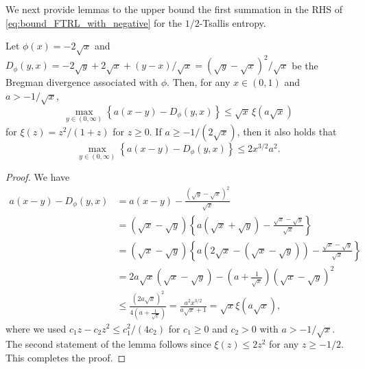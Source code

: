 We next provide lemmas to the upper bound the first summation in the RHS of \eqref{eq:bound_FTRL_with_negative} for the $1/2$-Tsallis entropy.
\begin{lemma}\label{lem:tsalis_stab_onedim}
Let $\phi(x) = - 2 \sqrt{x}$
and
$D_\phi(y, x) = - 2 \sqrt{y} + 2 \sqrt{x} + (y-x)/\sqrt{x} = (\sqrt{y} - \sqrt{x})^2 / \sqrt{x}$ 
be the Bregman divergence associated with $\phi$.
Then, for any 
$x \in (0,1)$
and 
$a > -1/\sqrt{x}$,
\begin{equation}
    \max_{y \in (0, \infty)} 
    \left\{
        a (x - y) - D_\phi(y, x) 
    \right\}
    \leq 
    \sqrt{x} \, \xi(a \sqrt{x})
    \nonumber
\end{equation}
for $\xi(z) = z^2 / (1 + z)$ for $z \geq 0$.
If $a \geq - 1/(2\sqrt{x})$, then it also holds that 
\begin{equation}
    \max_{y \in (0, \infty)} 
    \left\{
        a (x - y) - D_\phi(y, x) 
    \right\}
    \leq 
    2 x^{3/2} a^2
    .
    \nonumber
\end{equation}
\end{lemma}
\begin{proof}
We have
\begin{align}
  a (x - y) - D_\phi(y, x)
  &=
  a (x - y)
  -
  \frac{(\sqrt{y} - \sqrt{x})^2}{\sqrt{x}}
  \nonumber \\
  &=
  (\sqrt{x} - \sqrt{y})
  \left\{
      a (\sqrt{x} + \sqrt{y})
      -
      \frac{ \sqrt{x} - \sqrt{y} }{\sqrt{x}}
  \right\}
  \nonumber \\
  &=
  (\sqrt{x} - \sqrt{y})
  \left\{
      a \left(2 \sqrt{x} - (\sqrt{x} - \sqrt{y}) \right)
      -
      \frac{ \sqrt{x} - \sqrt{y} }{\sqrt{x}}
  \right\}
  \nonumber \\
  &=
  2 a \sqrt{x}
  (\sqrt{x} - \sqrt{y})
  -
  \left(
    a + \frac{1}{\sqrt{x}}
  \right)
  (\sqrt{x} - \sqrt{y})^2
  \nonumber \\
  &\leq
  \frac{(2 a \sqrt{x})^2}{4 \left(a + \frac{1}{\sqrt{x}}\right)}
  =
  \frac{a^2 x^{3/2}}{a \sqrt{x} + 1}
  =
  \sqrt{x} \xi(a \sqrt{x})
  ,
  \nonumber
\end{align}
where we used $c_1 z - c_2 z^2 \leq c_1^2 / (4 c_2)$ for $c_1 \geq 0$ and $c_2 > 0$ with $a > - 1/\sqrt{x}$.
The second statement of the lemma follows since 
$\xi(z) \leq 2 z^2$ for any $z \geq - 1/2$.
This completes the proof.
\end{proof}


